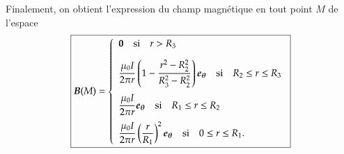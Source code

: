\begin{corrige}
\begin{enumerate}
	      Finalement, on obtient l'expression du champ magnétique en tout 
	      point $M$ de l'espace
	      \begin{equation*}
	      \boxed{
		     \vecb(M) = 
	      \left\{
		      \begin{array}{l}
			      \mathbf{0} \quad \mathrm{si} \quad r > R_3 \\[1em]
			      \dfrac{\mu_0 I}{2 \pi r} \left(1 - \dfrac{r^2 - R_2^2}
			      {R_3^2 - R_2^2} \right) \etheta \quad \mathrm{si} \quad
			      R_2 \le r \le R_3\\[1.5em]
			      \dfrac{\mu_0 I}{2 \pi r} \etheta \quad \mathrm{si} 
			      \quad R_1 \le r \le R_2\\[1em]
			      \dfrac{\mu_0 I}{2 \pi r}\left(\dfrac{r}{R_1}\right)^2
			      \etheta \quad \mathrm{si} \quad 0 \le r \le R_1.
		      \end{array}
		      \right.
	      }
	      \end{equation*}
\end{enumerate}
\end{corrige}
